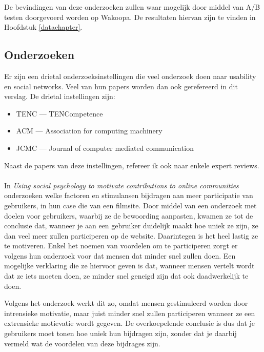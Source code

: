 \documentclass[a4paper, 10pt, pdftex]{article}
\begin{document}
      De bevindingen van deze onderzoeken zullen waar mogelijk door middel van A/B testen doorgevoerd worden op Wakoopa. De resultaten hiervan zijn te vinden in Hoofdstuk \ref{datachapter}.

    \subsection{Onderzoeken}
      Er zijn een drietal onderzoeksinstellingen die veel onderzoek doen naar usability en social networks. Veel van hun papers worden dan ook gerefereerd in dit verslag. De drietal instellingen zijn:
        \begin{itemize}
          \item TENC --- TENCompetence
          \item ACM --- Association for computing machinery
          \item JCMC --- Journal of computer mediated communication
        \end{itemize}
      Naast de papers van deze instellingen, refereer ik ook naar enkele expert reviews.

      \paragraph{\cite{Beenen2004}}

      In \emph{Using social psychology to motivate contributions to online communities} onderzoeken \cite{Beenen2004} welke factoren en stimulansen bijdragen aan meer participatie van gebruikers, in hun case die van een filmsite. Door middel van een onderzoek met doelen voor gebruikers, waarbij ze de bewoording aanpasten, kwamen ze tot de conclusie dat, wanneer je aan een gebruiker duidelijk maakt hoe uniek ze zijn, ze dan veel meer zullen participeren op de website. Daarintegen is het heel lastig ze te motiveren. Enkel het noemen van voordelen om te participeren zorgt er volgens hun onderzoek voor dat mensen dat minder snel zullen doen. Een mogelijke verklaring die ze hiervoor geven is dat, wanneer mensen vertelt wordt dat ze iets moeten doen, ze minder snel geneigd zijn dat ook daadwerkelijk te doen.

      Volgens het onderzoek werkt dit zo, omdat mensen gestimuleerd worden door intrensieke motivatie, maar juist minder snel zullen participeren wanneer ze een extrensieke motievatie wordt gegeven. De overkoepelende conclusie is dus dat je gebruikers moet tonen hoe uniek hun bijdragen zijn, zonder dat je daarbij vermeld wat de voordelen van deze bijdrages zijn.
\end{document}

